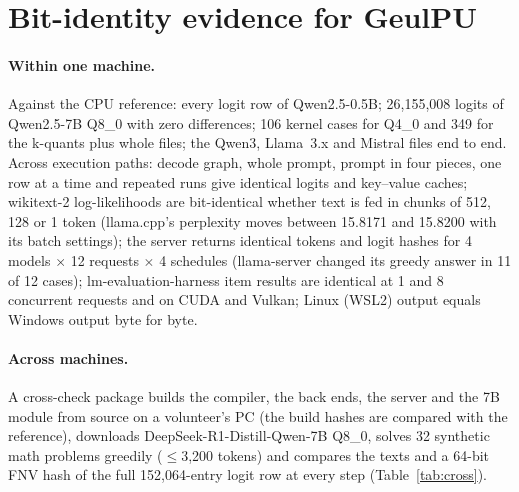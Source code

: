 \documentclass[11pt]{article}
\begin{document}
\appendix

\section{Bit-identity evidence for GeulPU}\label{app:bitid}

\paragraph{Within one machine.}
Against the CPU reference: every logit row of Qwen2.5-0.5B; 26,155,008 logits of Qwen2.5-7B Q8\_0 with zero differences;
106 kernel cases for Q4\_0 and 349 for the k-quants plus whole files; the Qwen3, Llama~3.x and Mistral files end to end.
Across execution paths: decode graph, whole prompt, prompt in four pieces, one row at a time and repeated runs give identical
logits and key--value caches; wikitext-2 log-likelihoods are bit-identical whether text is fed in chunks of 512, 128 or 1
token (llama.cpp's perplexity moves between 15.8171 and 15.8200 with its batch settings); the server returns identical
tokens and logit hashes for 4 models $\times$ 12 requests $\times$ 4 schedules (llama-server changed its greedy answer in 11
of 12 cases); lm-evaluation-harness item results are identical at 1 and 8 concurrent requests and on CUDA and Vulkan; Linux
(WSL2) output equals Windows output byte for byte.

\paragraph{Across machines.}
A cross-check package builds the compiler, the back ends, the server and the 7B module from source on a volunteer's PC (the
build hashes are compared with the reference), downloads DeepSeek-R1-Distill-Qwen-7B Q8\_0, solves 32 synthetic math
problems greedily ($\le$3,200 tokens) and compares the texts and a 64-bit FNV hash of the full 152,064-entry logit row at
every step (Table~\ref{tab:cross}).
\end{document}
